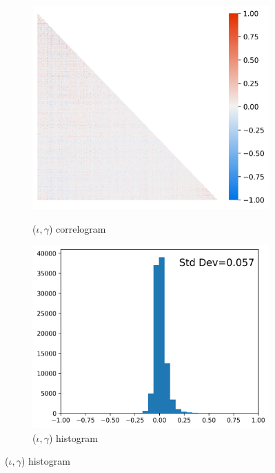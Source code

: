 \documentclass[12pt]{article}
\def\g{\gamma}
\def\i{\iota}
\theoremstyle{definition}
\theoremstyle{plain}
\begin{document}
\def\w{.45}
\begin{figure}[!htbp]
	\centering
	\caption{Skill Correlation Across Worker Types and Occupations}
	\begin{subfigure}[b]{\w\textwidth}
		\centering
		\caption{($\i,\g$) correlogram}
		\includegraphics[height=.25\textheight]{../Results/correlograms/correlograms_iota_gamma_sorted}
		\label{fig:correlograms_iota_gamma_sorted}
	\end{subfigure}\hfill
	\begin{subfigure}[b]{\w\textwidth}
		\centering
		\caption{($\i,\g$) histogram}
		\includegraphics[height=.25\textheight]{../Results/correlograms/correlograms_hist_iota_gamma_sorted}

\end{subfigure}
\end{figure}
\end{document}
